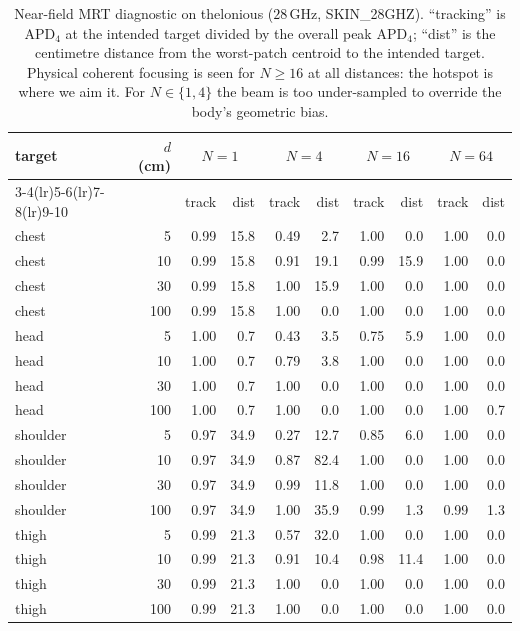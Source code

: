 \documentclass[journal]{IEEEtran}
\newcommand{\APD}{\mathrm{APD}}
\begin{document}
\begin{table}[!t]\small
\centering
\caption{Near-field MRT diagnostic on thelonious
($28$\,GHz, SKIN\_28GHZ). ``tracking'' is $\APD_4$ at the intended
target divided by the overall peak $\APD_4$; ``dist'' is the
centimetre distance from the worst-patch centroid to the intended
target. Physical coherent focusing is seen for $N\!\ge\!16$ at all
distances: the hotspot is where we aim it. For $N\!\in\!\{1,4\}$ the
beam is too under-sampled to override the body's geometric bias.}
\label{tab:trackingA}
\begin{tabular}{lr rr rr rr rr}
\toprule
target & $d$ (cm) &
\multicolumn{2}{c}{$N\!=\!1$} &
\multicolumn{2}{c}{$N\!=\!4$} &
\multicolumn{2}{c}{$N\!=\!16$} &
\multicolumn{2}{c}{$N\!=\!64$} \\
\cmidrule(lr){3-4}\cmidrule(lr){5-6}\cmidrule(lr){7-8}\cmidrule(lr){9-10}
 & & track & dist & track & dist & track & dist & track & dist \\
\midrule
chest   &   5 & 0.99 & 15.8 & 0.49 &  2.7 & 1.00 &  0.0 & 1.00 & 0.0 \\
chest   &  10 & 0.99 & 15.8 & 0.91 & 19.1 & 0.99 & 15.9 & 1.00 & 0.0 \\
chest   &  30 & 0.99 & 15.8 & 1.00 & 15.9 & 1.00 &  0.0 & 1.00 & 0.0 \\
chest   & 100 & 0.99 & 15.8 & 1.00 &  0.0 & 1.00 &  0.0 & 1.00 & 0.0 \\
head    &   5 & 1.00 &  0.7 & 0.43 &  3.5 & 0.75 &  5.9 & 1.00 & 0.0 \\
head    &  10 & 1.00 &  0.7 & 0.79 &  3.8 & 1.00 &  0.0 & 1.00 & 0.0 \\
head    &  30 & 1.00 &  0.7 & 1.00 &  0.0 & 1.00 &  0.0 & 1.00 & 0.0 \\
head    & 100 & 1.00 &  0.7 & 1.00 &  0.0 & 1.00 &  0.0 & 1.00 & 0.7 \\
shoulder&   5 & 0.97 & 34.9 & 0.27 & 12.7 & 0.85 &  6.0 & 1.00 & 0.0 \\
shoulder&  10 & 0.97 & 34.9 & 0.87 & 82.4 & 1.00 &  0.0 & 1.00 & 0.0 \\
shoulder&  30 & 0.97 & 34.9 & 0.99 & 11.8 & 1.00 &  0.0 & 1.00 & 0.0 \\
shoulder& 100 & 0.97 & 34.9 & 1.00 & 35.9 & 0.99 &  1.3 & 0.99 & 1.3 \\
thigh   &   5 & 0.99 & 21.3 & 0.57 & 32.0 & 1.00 &  0.0 & 1.00 & 0.0 \\
thigh   &  10 & 0.99 & 21.3 & 0.91 & 10.4 & 0.98 & 11.4 & 1.00 & 0.0 \\
thigh   &  30 & 0.99 & 21.3 & 1.00 &  0.0 & 1.00 &  0.0 & 1.00 & 0.0 \\
thigh   & 100 & 0.99 & 21.3 & 1.00 &  0.0 & 1.00 &  0.0 & 1.00 & 0.0 \\
\bottomrule
\end{tabular}
\end{table}
\end{document}
